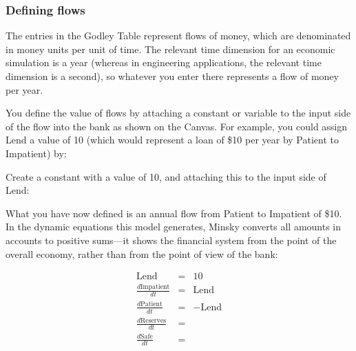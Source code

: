 \subsubsection{Defining flows}

The entries in the Godley Table represent flows of money, which are
denominated in money units per unit of time. The relevant time dimension
for an economic simulation is a year (whereas in engineering applications,
the relevant time dimension is a second), so whatever you enter there
represents a flow of money per year.

You define the value of flows by attaching a constant or variable
to the input side of the flow into the bank as shown on the Canvas.
For example, you could assign Lend a value of 10 (which would represent
a loan of \$10 per year by Patient to Impatient) by:

Create a constant with a value of 10, and attaching this to the input
side of Lend:
\begin{center}
\par\end{center}

What you have now defined is an annual flow from Patient to Impatient
of \$10. In the dynamic equations this model generates, Minsky converts
all amounts in accounts to positive sums---it shows the financial
system from the point of the overall economy, rather than from the
point of view of the bank:

\begin{eqnarray*}
\mathrm{Lend} & = & 10\\
\frac{d\mathrm{Impatient}}{dt} & = & \mathrm{Lend}\\
\frac{d\mathrm{Patient}}{dt} & = & -\mathrm{Lend}\\
\frac{d\mathrm{Reserves}}{dt} & =\\
\frac{d\mathrm{Safe}}{dt} & =
\end{eqnarray*}

